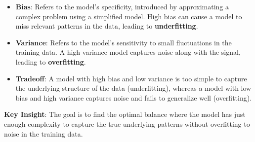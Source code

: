 \begin{itemize}
  \item \textbf{Bias}: Refers to the model's specificity, introduced by approximating a complex problem using a simplified model. High bias can cause a model to miss relevant patterns in the data, leading to \textbf{underfitting}.
  
  \item \textbf{Variance}: Refers to the model's sensitivity to small fluctuations in the training data. A high-variance model captures noise along with the signal, leading to \textbf{overfitting}.
  
  \item \textbf{Tradeoff}: A model with high bias and low variance is too simple to capture the underlying structure of the data (underfitting), whereas a model with low bias and high variance captures noise and fails to generalize well (overfitting).
\end{itemize}

\textbf{Key Insight}: The goal is to find the optimal balance where the model has just enough complexity to capture the true underlying patterns without overfitting to noise in the training data.
